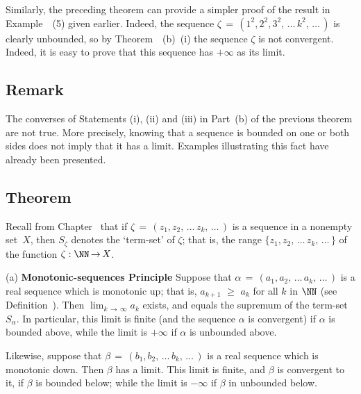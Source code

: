         Similarly, the preceding theorem can provide a simpler proof of the result in Example~~(5) given earlier.
    Indeed, the sequence ${\zeta} \,=\, (1^{2}, 2^{2}, 3^{2},\,{\ldots}\,k^{2},\,{\ldots}\,)$ is clearly unbounded,
    so by Theorem~~(b)~(i) the sequence ${\zeta}$ is not convergent. Indeed, it is easy to prove that this sequence has $+{\infty}$ as its limit.

\VV

            \subsection{\small{\bf Remark}}
            \label{RemrkC20.11B}

\V

        The converses of Statements (i), (ii) and (iii) in Part~(b) of the previous theorem are not true.
    More precisely, knowing that a sequence is bounded on one or both sides does not imply that it has a limit. Examples illustrating this fact have already been presented.


\VV


            \subsection{\small{\bf Theorem}}
            \label{ThmC20.10B}

\V

        Recall from Chapter~ that if ${\zeta} \,=\, (z_{1}, z_{2},\,{\ldots}\,z_{k},\,{\ldots}\,)$ is a sequence in a nonempty set~$X$,
    then $S_{{\zeta}}$ denotes the `term-set' of ${\zeta}$; that is, the range $\{z_{1}, z_{2}, \,{\ldots}\,z_{k}, \,{\ldots}\,\}$
    of the function ${\zeta}:{\NN} \,{\rightarrow}\, X$.

\V

        (a) {\bf Monotonic-sequences Principle}
    Suppose that ${\alpha} \,=\, (a_{1},a_{2},\,{\ldots}\,a_{k},\,{\ldots}\,)$  is a real sequence which is monotonic up;
    that is, $a_{k+1}\,\,{\geq}\,\,a_{k}$ for all $k$ in ${\NN}$ (see Definition~).
    Then $\lim_{k \,{\rightarrow}\, {\infty}} a_{k}$ exists, and equals the supremum of the term-set $S_{{\alpha}}$.
    In particular, this limit is finite (and the sequence ${\alpha}$ is convergent)
    if ${\alpha}$ is bounded above, while the limit is $+{\infty}$ if ${\alpha}$ is unbounded above.

        Likewise, suppose that ${\beta} \,=\, (b_{1},b_{2},\,{\ldots}\,b_{k},\,{\ldots}\,)$
    is a real sequence which is monotonic down. Then ${\beta}$ has a limit. This limit is finite,
    and ${\beta}$ is convergent to it, if ${\beta}$ is bounded below; while the limit is  $-{\infty}$ if ${\beta}$ in unbounded below.

